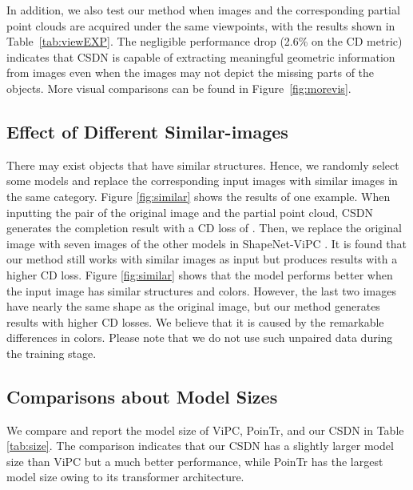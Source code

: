 In addition, we also test our method when images and the corresponding partial point clouds are acquired under the same viewpoints, with the results shown in Table~\ref{tab:viewEXP}. The negligible performance drop (2.6\% on the CD metric) indicates that CSDN is capable of extracting meaningful geometric information from images even when the images may not depict the missing parts of the objects. More visual comparisons can be found in Figure~\ref{fig:morevis}.

\subsection{Effect of Different Similar-images}
There may exist objects that have similar structures. Hence, we randomly select some models and replace the corresponding input images with similar images in the same category. 
Figure \ref{fig:similar} shows the results of one example. When inputting the pair of the original image and the partial point cloud, CSDN generates the completion result with a CD loss of . 
Then, we replace the original image with seven images of the other models in ShapeNet-ViPC \cite{zhang2021view}. It is found that our method still works with similar images as input but produces results with a higher CD loss. Figure \ref{fig:similar} shows that the model performs better when the input image has similar structures and colors.
However, the last two images have nearly the same shape as the original image, but our method generates results with higher CD losses. We believe that it is caused by the remarkable differences in colors. Please note that we do not use such unpaired data during the training stage.
\subsection{Comparisons about Model Sizes}
We compare and report the model size of ViPC, PoinTr, and our CSDN in Table \ref{tab:size}. 
The comparison indicates that our CSDN has a slightly larger model size than ViPC but a much better performance, while PoinTr has the largest model size owing to its transformer architecture.

